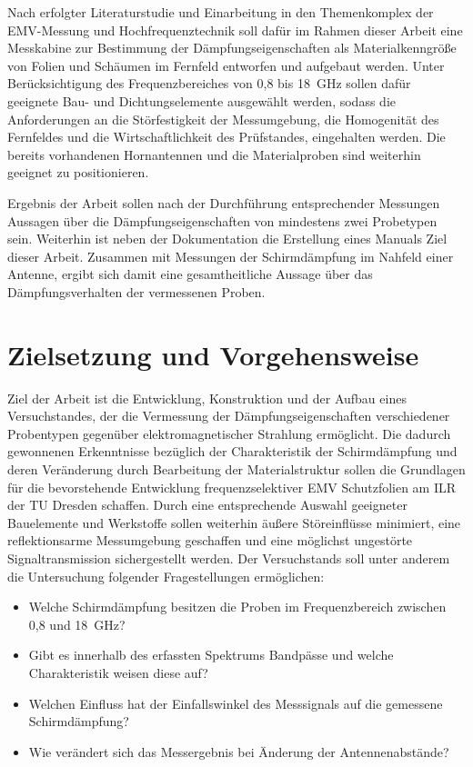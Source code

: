 \vspace{\linespace}
Nach erfolgter Literaturstudie und Einarbeitung in den Themenkomplex der EMV-Messung und Hochfrequenztechnik soll dafür im Rahmen dieser Arbeit eine Messkabine zur Bestimmung der Dämpfungseigenschaften als Materialkenngröße von Folien und Schäumen im Fernfeld entworfen und aufgebaut werden. Unter Berücksichtigung des Frequenzbereiches von 0,8 bis \SI{18}{\giga\hertz} sollen dafür geeignete Bau- und Dichtungselemente ausgewählt werden, sodass die Anforderungen an die Störfestigkeit der Messumgebung, die Homogenität des Fernfeldes und die Wirtschaftlichkeit des Prüfstandes, eingehalten werden. Die bereits vorhandenen Hornantennen und die Materialproben sind weiterhin geeignet zu positionieren.
\par
\vspace{\linespace}
Ergebnis der Arbeit sollen nach der Durchführung entsprechender Messungen Aussagen über die Dämpfungseigenschaften von mindestens zwei Probetypen sein. Weiterhin ist neben der Dokumentation die Erstellung eines Manuals Ziel dieser Arbeit. Zusammen mit Messungen der Schirmdämpfung im Nahfeld einer Antenne, ergibt sich damit eine gesamtheitliche Aussage über das Dämpfungsverhalten der vermessenen Proben.



\chapter{Zielsetzung und Vorgehensweise}

Ziel der Arbeit ist die Entwicklung, Konstruktion und der Aufbau eines Versuchstandes, der die Vermessung der Dämpfungseigenschaften verschiedener Probentypen gegenüber elektromagnetischer Strahlung ermöglicht. Die dadurch gewonnenen Erkenntnisse bezüglich der Charakteristik der Schirmdämpfung und deren Veränderung durch Bearbeitung der Materialstruktur sollen die Grundlagen für die bevorstehende Entwicklung frequenzselektiver EMV Schutzfolien am ILR der TU Dresden schaffen. Durch eine entsprechende Auswahl geeigneter Bauelemente und Werkstoffe sollen weiterhin äußere Störeinflüsse minimiert, eine reflektionsarme Messumgebung geschaffen und eine möglichst ungestörte Signaltransmission sichergestellt werden. Der Versuchstands soll unter anderem die Untersuchung folgender Fragestellungen ermöglichen:

\renewcommand\labelitemi{$\vcenter{\hbox{\small$\bullet$}}$}
\begin{itemize}
    \item Welche Schirmdämpfung besitzen die Proben im Frequenzbereich zwischen 0,8 und \SI{18}{\giga\hertz}?
    \item Gibt es innerhalb des erfassten Spektrums Bandpässe und welche Charakteristik weisen diese auf?
    \item Welchen Einfluss hat der Einfallswinkel des Messsignals auf die gemessene Schirmdämpfung?
    \item Wie verändert sich das Messergebnis bei Änderung der Antennenabstände?
\end{itemize}

